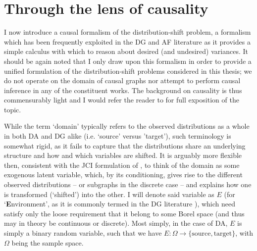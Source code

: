 \section{Through the lens of causality}\label{sec:lens-of-causality}
I now introduce a causal formalism of the distribution-shift problem, a formalism which has been
frequently exploited in the \ac{DG} and \ac{AF} literature as it provides a simple calculus with
which to reason about desired (and undesired) variances.
%
It should be again noted that I only draw upon this formalism in order to provide a unified
formulation of the distribution-shift problems considered in this thesis; we do not operate on the
domain of causal graphs nor attempt to perform causal inference in any of the constituent works. 
%
The background on causality is thus commensurably light and I would refer the reader to
\citet{pearl2009causality} for full exposition of the topic.

While the term `domain' typically refers to the observed distributions as a whole in both \ac{DA}
and \ac{DG} alike (i.e. `source' versus 'target'), such terminology is somewhat rigid, as it fails
to capture that the distributions share an underlying structure and how and which variables are
shifted.
%
%
It is arguably more flexible then, consistent with the JCI formulation of \cite{mooij2020joint}, to
think of the domain as some exogenous latent variable, which, by its conditioning, gives rise to
the different observed distributions -- or subgraphs in the discrete case -- and explains how one
is transformed (`shifted') into the other.
%
I will denote said variable as \(E\) (for `\textbf{E}nvironment', as it is commonly termed in the
\ac{DG} literature \citep{arjovsky2019invariant}), which need satisfy only the loose requirement that it
belong to some Borel space (and thus may in theory be continuous or discrete).
%
Most simply, in the case of \ac{DA}, \(E\) is simply a binary random variable, such that we have \(E:
\Omega \to \{ \text{source}, \text{target} \}\), with \( \Omega \) being the sample space.
%

